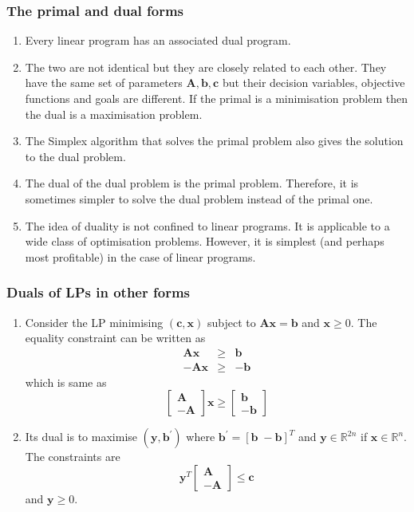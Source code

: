 \documentclass{beamer}
\begin{document}
\begin{frame}
\frametitle{The primal and dual forms}
\begin{enumerate}
\item Every linear program has an associated dual program.
\item The two are not identical but they are closely related to each other.
They have the same set of parameters $\bm{A}, \bm{b}, \bm{c}$ but their 
decision variables, objective functions and goals are different. If the primal
is a minimisation problem then the dual is a maximisation problem.
\item The Simplex algorithm that solves the primal problem also gives the
solution to the dual problem.
\item The dual of the dual problem is the primal problem. Therefore, it is
sometimes simpler to solve the dual problem instead of the primal one.
\item The idea of duality is not confined to linear programs. It is applicable 
to a wide class of optimisation problems. However, it is simplest (and perhaps
most profitable) in the case of linear programs.
\end{enumerate}
\end{frame}

\begin{frame}
\frametitle{Duals of LPs in other forms}
\begin{enumerate}
\item Consider the LP minimising $(\bm{c}, \bm{x})$ subject to $\bm{A}\bm{x} =
\bm{b}$ and $\bm{x} \ge 0$. The equality constraint can be written as 
\begin{eqnarray}
\bm{A}\bm{x} &\ge& \bm{b} \label{e9} \\
-\bm{A}\bm{x} &\ge& -\bm{b} \label{e10}
\end{eqnarray}
which is same as
\begin{equation}\label{e11}
\begin{bmatrix}\bm{A} \\ -\bm{A}\end{bmatrix}\bm{x} \ge 
\begin{bmatrix}\bm{b} \\ -\bm{b}\end{bmatrix}
\end{equation}
\item Its dual is to maximise $(\bm{y}, \bm{b}^\prime)$ where $\bm{b}^\prime =
[\bm{b}\;-\bm{b}]^T$ and $\bm{y} \in \mathbb{R}^{2n}$ if $\bm{x} \in 
\mathbb{R}^n$. The constraints are
\begin{equation}\label{e12}
\bm{y}^T\begin{bmatrix}\bm{A} \\ -\bm{A}\end{bmatrix} \le \bm{c}
\end{equation}
and $\bm{y} \ge 0$.
\end{enumerate}
\end{frame}
\end{document}
